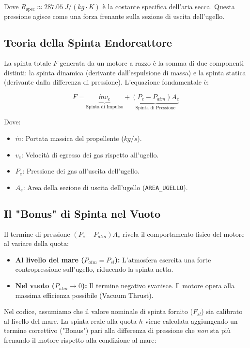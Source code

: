 \documentclass[12pt,a4paper]{article}
\begin{document}
Dove $R_{\text{spec}} \approx \SI{287.05}{J/(kg \cdot K)}$ è la costante specifica dell'aria secca. Questa pressione agisce come una forza frenante sulla sezione di uscita dell'ugello.

\subsection{Teoria della Spinta Endoreattore}
La spinta totale $F$ generata da un motore a razzo è la somma di due componenti distinti: la spinta dinamica (derivante dall'espulsione di massa) e la spinta statica (derivante dalla differenza di pressione). L'equazione fondamentale è:

\begin{equation}
    F = \underbrace{\dot{m} v_e}_{\text{Spinta di Impulso}} + \underbrace{(P_e - P_{atm}) A_e}_{\text{Spinta di Pressione}}
\end{equation}

Dove:
\begin{itemize}
    \item $\dot{m}$: Portata massica del propellente ($\si{kg/s}$).
    \item $v_e$: Velocità di egresso dei gas rispetto all'ugello.
    \item $P_e$: Pressione dei gas all'uscita dell'ugello.
    \item $A_e$: Area della sezione di uscita dell'ugello (\texttt{AREA\_UGELLO}).
\end{itemize}

\subsection{ Il "Bonus" di Spinta nel Vuoto}
Il termine di pressione $(P_e - P_{atm}) A_e$ rivela il comportamento fisico del motore al variare della quota:
\begin{itemize}
    \item \textbf{Al livello del mare ($P_{atm} = P_{sl}$):} L'atmosfera esercita una forte contropressione sull'ugello, riducendo la spinta netta.
    \item \textbf{Nel vuoto ($P_{atm} \to 0$):} Il termine negativo svanisce. Il motore opera alla massima efficienza possibile (Vacuum Thrust).
\end{itemize}

Nel codice, assumiamo che il valore nominale di spinta fornito ($F_{sl}$) sia calibrato al livello del mare. La spinta reale alla quota $h$ viene calcolata aggiungendo un termine correttivo ("Bonus") pari alla differenza di pressione che \textit{non} sta più frenando il motore rispetto alla condizione al mare:
\end{document}
